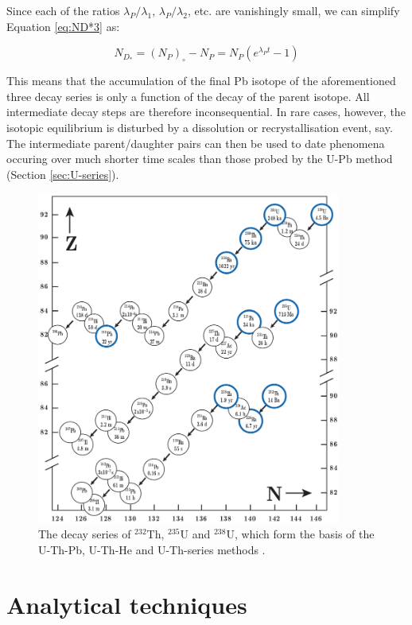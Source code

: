 \documentclass{book}
\newif\ifpdf
\begin{document}
Since each of the ratios $\lambda_P/\lambda_1$, $\lambda_P/\lambda_2$,
etc.  are vanishingly small, we can simplify Equation \ref{eq:ND*3}
as:

\begin{equation}
N_{D_*} = (N_{P})_\circ - N_P = N_P \left( e^{\lambda_P t} -1 \right)
\label{eq:ND*4}
\end{equation}

This means that the accumulation of the final Pb isotope of the
aforementioned three decay series is only a function of the decay of
the parent isotope.  All intermediate decay steps are therefore
inconsequential. In rare cases, however, the isotopic equilibrium is
disturbed by a dissolution or recrystallisation event, say. The
intermediate parent/daughter pairs can then be used to date phenomena
occuring over much shorter time scales than those probed by the U-Pb
method (Section \ref{sec:U-series}).

\begin{figure}[!ht]
  \centering
  \ifpdf
  \texttt{[image: U-Th-series.pdf]}
  \else
  \includegraphics[width=10cm]{U-Th-series.png}
  \fi
  \caption{The decay series of $^{232}$Th, $^{235}$U and $^{238}$U,
    which form the basis of the U-Th-Pb, U-Th-He and U-Th-series methods
    \citep[modified from][]{allegre2008}.}
  \label{fig:U-Th-series}
\end{figure}

\chapter{Analytical techniques}
\end{document}
